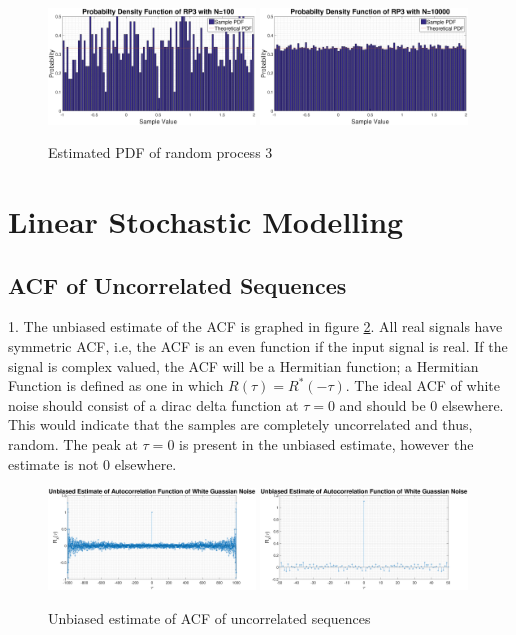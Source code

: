 \documentclass{article}
\begin{document}
\begin{figure}[H]
\centering{}
\includegraphics[width=0.49\textwidth]{pdf_of_RP3_1}
\includegraphics[width=0.49\textwidth]{pdf_of_RP3_2}
\caption{Estimated PDF of random process 3}
\label{fig:pdf_of_RP3}
\end{figure}
\newpage
\section{Linear Stochastic Modelling}
\subsection{ACF of Uncorrelated Sequences}\label{sec:acf_uncorrelated}

1. The unbiased estimate of the ACF is graphed in figure \ref{fig:acf_uncorrelated}. All real signals have symmetric ACF, i.e, the ACF is an even function if the input signal is real. If the signal is complex valued, the ACF will be a Hermitian function; a Hermitian Function is defined as one in which $R(\tau) = R^{*}(-\tau)$. The ideal ACF of white noise should consist of a dirac delta function at $\tau = 0$ and should be $0$ elsewhere. This would indicate that the samples are completely uncorrelated and thus, random. The peak at $\tau = 0$ is present in the unbiased estimate, however the estimate is not $0$ elsewhere. 

\begin{figure}[H]
    \centering
    \includegraphics[width=0.49\textwidth]{acf_uncorrelated}
    \includegraphics[width=0.49\textwidth]{acf_uncorrelated_zoom}
    \caption{Unbiased estimate of ACF of uncorrelated sequences}
    \label{fig:acf_uncorrelated}
\end{figure}
\end{document}
